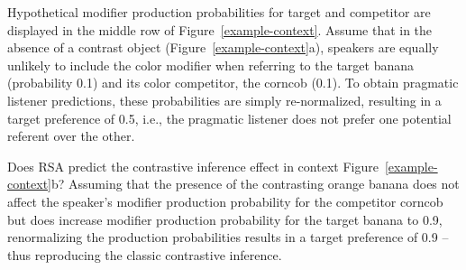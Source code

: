 \documentclass[10pt,letterpaper]{article}
\newcommand{\ek}[1]{\textcolor{Orange}{[ek: #1]}}
\newcommand{\jd}[1]{\textcolor{Purple}{[jd: #1]}}
\begin{document}
Hypothetical modifier production probabilities for target and competitor are displayed in the middle row of Figure~\ref{example-context}.%
Assume that in the absence of a contrast object (Figure~\ref{example-context}a), speakers are equally unlikely to include the color modifier when referring to the target banana (probability 0.1) and its color competitor, the corncob (0.1). To obtain pragmatic listener predictions, these probabilities are simply re-normalized, resulting in a target preference of 0.5, i.e., the pragmatic listener does not  prefer one potential referent over the other.


Does RSA predict the contrastive inference effect in context Figure~\ref{example-context}b? Assuming that the presence of the contrasting orange banana does not affect the speaker's modifier production probability for the competitor corncob but does increase modifier production probability for the target banana to 0.9,  renormalizing the production probabilities results in a target preference of 0.9 -- thus reproducing the classic contrastive inference.%
\end{document}
